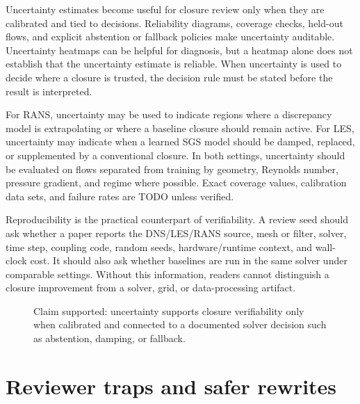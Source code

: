 \documentclass[11pt]{article}
\begin{document}
Uncertainty estimates become useful for closure review only when they are calibrated and tied to decisions. Reliability diagrams, coverage checks, held-out flows, and explicit abstention or fallback policies make uncertainty auditable. Uncertainty heatmaps can be helpful for diagnosis, but a heatmap alone does not establish that the uncertainty estimate is reliable. When uncertainty is used to decide where a closure is trusted, the decision rule must be stated before the result is interpreted.

For RANS, uncertainty may be used to indicate regions where a discrepancy model is extrapolating or where a baseline closure should remain active. For LES, uncertainty may indicate when a learned SGS model should be damped, replaced, or supplemented by a conventional closure. In both settings, uncertainty should be evaluated on flows separated from training by geometry, Reynolds number, pressure gradient, and regime where possible. Exact coverage values, calibration data sets, and failure rates are TODO unless verified.

Reproducibility is the practical counterpart of verifiability. A review seed should ask whether a paper reports the DNS/LES/RANS source, mesh or filter, solver, time step, coupling code, random seeds, hardware/runtime context, and wall-clock cost. It should also ask whether baselines are run in the same solver under comparable settings. Without this information, readers cannot distinguish a closure improvement from a solver, grid, or data-processing artifact.

\begin{figure}[t]
\centering
{}
\caption{Claim supported: uncertainty supports closure verifiability only when calibrated and connected to a documented solver decision such as abstention, damping, or fallback.}
\label{fig:uq-flow}
\end{figure}

\section{Reviewer traps and safer rewrites}
\end{document}
